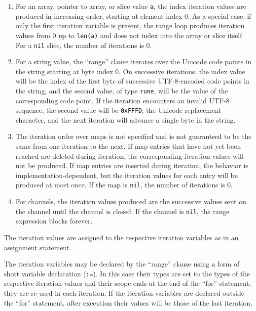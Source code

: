 \begin{enumerate}
\item
  For an array, pointer to array, or slice value \texttt{a}, the index
  iteration values are produced in increasing order, starting at element
  index 0. As a special case, if only the first iteration variable is
  present, the range loop produces iteration values from 0 up to
  \texttt{len(a)} and does not index into the array or slice itself. For
  a \texttt{nil} slice, the number of iterations is 0.
\item
  For a string value, the ``range'' clause iterates over the Unicode
  code points in the string starting at byte index 0. On successive
  iterations, the index value will be the index of the first byte of
  successive UTF-8-encoded code points in the string, and the second
  value, of type \texttt{rune}, will be the value of the corresponding
  code point. If the iteration encounters an invalid UTF-8 sequence, the
  second value will be \texttt{0xFFFD}, the Unicode replacement
  character, and the next iteration will advance a single byte in the
  string.
\item
  The iteration order over maps is not specified and is not guaranteed
  to be the same from one iteration to the next. If map entries that
  have not yet been reached are deleted during iteration, the
  corresponding iteration values will not be produced. If map entries
  are inserted during iteration, the behavior is
  implementation-dependent, but the iteration values for each entry will
  be produced at most once. If the map is \texttt{nil}, the number of
  iterations is 0.
\item
  For channels, the iteration values produced are the successive values
  sent on the channel until the channel is closed. If
  the channel is \texttt{nil}, the range expression blocks forever.
\end{enumerate}

The iteration values are assigned to the respective iteration variables
as in an assignment statement.

The iteration variables may be declared by the ``range'' clause using a
form of short variable declaration (\texttt{:=}). In this case their types are set to the
types of the respective iteration values and their
scope ends at the end of the
``for'' statement; they are re-used in each iteration. If the iteration
variables are declared outside the ``for'' statement, after execution
their values will be those of the last iteration.

